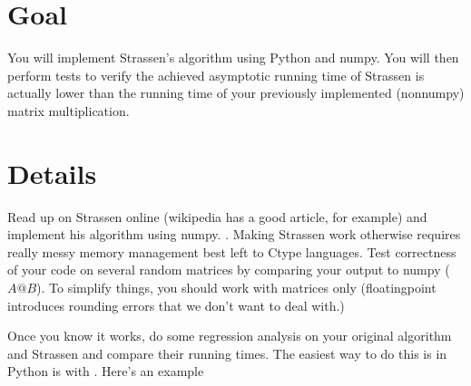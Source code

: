\documentclass[letterpaper,10pt,english]{jupyterBook}
\begin{document}
\section{Goal}
\label{\detokenize{lessons/Strassen-Lab:goal}}
\sphinxAtStartPar
You will implement Strassen’s algorithm using Python and numpy. You will then
perform tests to verify the achieved asymptotic running time of Strassen is actually lower than
the running time of your previously implemented (non\sphinxhyphen{}numpy) matrix multiplication.


\section{Details}
\label{\detokenize{lessons/Strassen-Lab:details}}
\sphinxAtStartPar
Read up on Strassen online (wikipedia has a good article, for example) and implement his algorithm using numpy. . Making Strassen work otherwise requires really messy memory management best left to C\sphinxhyphen{}type languages. Test correctness of your code on several random matrices by comparing your output to numpy (\(A @ B\)). To simplify things, you should work with  matrices only (floating\sphinxhyphen{}point introduces rounding errors that we don’t want to deal with.)

\sphinxAtStartPar
Once you know it works, do some regression analysis on your original algorithm and Strassen and compare their running times. The easiest way to do this is in Python is with . Here’s an example

\begin{sphinxVerbatim}[commandchars=\\\{\}]
 

  
   
    
\end{sphinxVerbatim}
\end{document}
